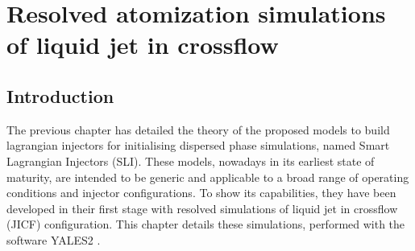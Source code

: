 \chapter{Resolved atomization simulations of liquid jet in crossflow}
\label{ch5:jicf_resolved_simulations}

%
%
%	
%	
%	
%	
%	
%	
%	
%		
%			
%			
%	
%		
%	
%		
%			
%		
%
%

\section{Introduction}

The previous chapter has detailed the theory of the proposed models to build lagrangian injectors for initialising dispersed phase simulations, named Smart Lagrangian Injectors (SLI). These models, nowadays in its earliest state of maturity, are intended to be generic and applicable to a broad range of operating conditions and injector configurations. To show its capabilities, they have been developed in their first stage with resolved simulations of liquid jet in crossflow (JICF) configuration. This chapter details these simulations, performed with the software YALES2 . %

